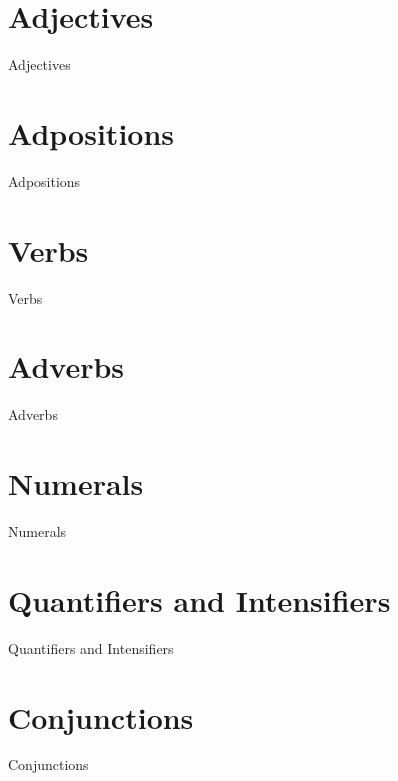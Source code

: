 \section{Adjectives}
\label{sec:tvk-adjectives}

Adjectives

\section{Adpositions}
\label{sec:tvk-adpositions}

Adpositions

\section{Verbs}
\label{sec:tvk-verbs}

Verbs

\section{Adverbs}
\label{sec:tvk-adverbs}

Adverbs

\section{Numerals}
\label{sec:tvk-numerals}

Numerals

\section{Quantifiers and Intensifiers}
\label{sec:tvk-quant-intens}

Quantifiers and Intensifiers

\section{Conjunctions}
\label{sec:tvk-conjunctions}

Conjunctions
